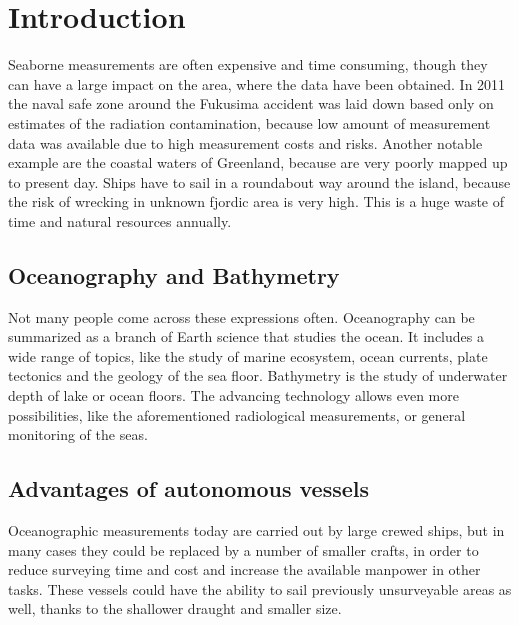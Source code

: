 \section{Introduction}

Seaborne measurements are often expensive and time consuming, though they can have a large impact on the area, where the data have been obtained. In 2011 the naval safe zone around the Fukusima accident was laid down based only on estimates of the radiation contamination\cite{FNPP}, because low amount of measurement data was available due to high measurement costs and risks. Another notable example are the coastal waters of Greenland, because are very poorly mapped up to present day\cite{2009AGUFMOS21A1152W}. Ships have to sail in a roundabout way around the island, because the risk of wrecking in unknown fjordic area is very high. This is a huge waste of time and natural resources annually.

\subsection*{Oceanography and Bathymetry}

Not many people come across these expressions often. Oceanography can be summarized as a branch of Earth science that studies the ocean. It includes a wide range of topics, like the study of marine ecosystem, ocean currents, plate tectonics and the geology of the sea floor. Bathymetry is the study of underwater depth of lake or ocean floors. The advancing technology allows even more possibilities, like the aforementioned radiological measurements, or general monitoring of the seas.

\subsection*{Advantages of autonomous vessels}

Oceanographic measurements today are carried out by large crewed ships, but in many cases they could be replaced by a number of smaller crafts, in order to reduce surveying time and cost and increase the available manpower in other tasks. These vessels could have the ability to sail previously unsurveyable areas as well, thanks to the shallower draught and smaller size.

